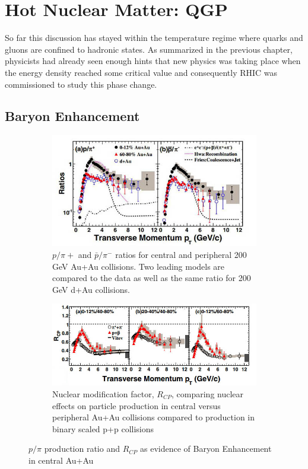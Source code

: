 \section{Hot Nuclear Matter: QGP}
So far this discussion has stayed within the temperature regime where quarks and gluons are confined to hadronic states. As summarized in the previous chapter, physicists had already seen enough hints that new physics was taking place when the energy density reached some critical value and consequently RHIC was commissioned to study this phase change.

\subsection{Baryon Enhancement}

\begin{figure}
\centering
\begin{subfigure}[b]{0.7\textwidth}
    \centering
    \includegraphics[width=\textwidth]{prevplots/ppiratiocentvsperiph.JPG}
    \caption{ $p/\pi{+}$ and $\bar{p}/\pi^{-}$ ratios for central and peripheral 200 GeV Au+Au collisions. Two leading models are compared to the data as well as the same ratio for 200 GeV d+Au collisions.}
    \label{fig:ppiratiocentvsperiph}
\end{subfigure}
\begin{subfigure}[b]{0.8\textwidth}
    \centering
    \includegraphics[width=\textwidth]{prevplots/Rcpcentvsperiph.jpg}
    \caption{Nuclear modification factor, $R_{CP}$, comparing nuclear effects on particle production in central versus peripheral Au+Au collisions compared to production in binary scaled p+p collisions}
    \label{fig:Rcpcentvsperiph}
\end{subfigure}
\caption[Evidence of Baryon Enhancement in Au+Au collisions]{$p/\pi$ production ratio and $R_{CP}$ as evidence of Baryon Enhancement in central Au+Au}
\label{fig:baryonenhancementAA}
\end{figure}

